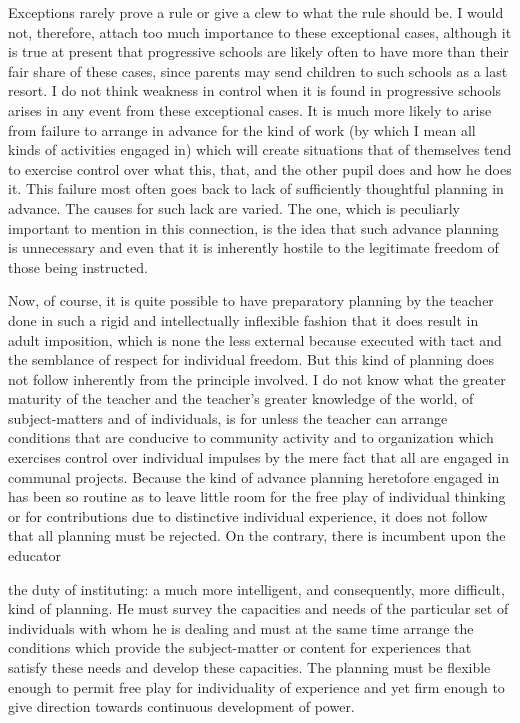 Exceptions rarely prove a rule or give a clew to what the rule should be. I would not, 
therefore, attach too much importance to these exceptional cases, although it is true at 
present that progressive schools are likely often to have more than their fair share of these 
cases, since parents may send children to such schools as a last resort. I do not think 
weakness in control when it is found in progressive schools arises in any event from these 
exceptional cases. It is much more likely to arise from failure to arrange in advance for 
the kind of work (by which I mean all kinds of activities engaged in) which will create 
situations that of themselves tend to exercise control over what this, that, and the other 
pupil does and how he does it. This failure most often goes back to lack of sufficiently 
thoughtful planning in advance. The causes for such lack are varied. The one, which is 
peculiarly important to mention in this connection, is the idea that such advance planning 
is unnecessary and even that it is inherently hostile to the legitimate freedom of those 
being instructed. 

Now, of course, it is quite possible to have preparatory planning by the teacher done in 
such a rigid and intellectually inflexible fashion that it does result in adult imposition, 
which is none the less external because executed with tact and the semblance of respect 
for individual freedom. But this kind of planning does not follow inherently from the 
principle involved. I do not know what the greater maturity of the teacher and the 
teacher's greater knowledge of the world, of subject-matters and of individuals, is for 
unless the teacher can arrange conditions that are conducive to community activity and to 
organization which exercises control over individual impulses by the mere fact that all 
are engaged in communal projects. Because the kind of advance planning heretofore 
engaged in has been so routine as to leave little room for the free play of individual 
thinking or for contributions due to distinctive individual experience, it does not follow 
that all planning must be rejected. On the contrary, there is incumbent upon the educator 



the duty of instituting: a much more intelligent, and consequently, more difficult, kind of 
planning. He must survey the capacities and needs of the particular set of individuals with 
whom he is dealing and must at the same time arrange the conditions which provide the 
subject-matter or content for experiences that satisfy these needs and develop these 
capacities. The planning must be flexible enough to permit free play for individuality of 
experience and yet firm enough to give direction towards continuous development of 
power. 

